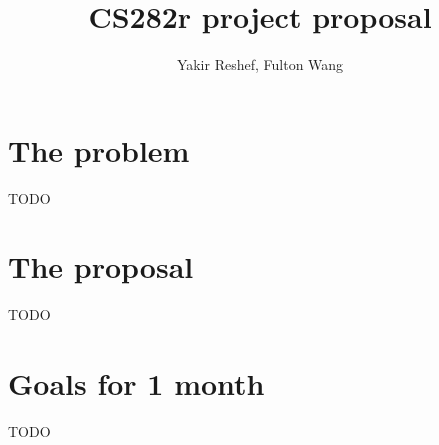\documentclass[11pt]{amsart}
\title{CS282r project proposal}
\author{Yakir Reshef, Fulton Wang}
\begin{document}
\maketitle
\section{The problem}
TODO

\section{The proposal}
TODO

\section{Goals for 1 month}
TODO
\end{document}
